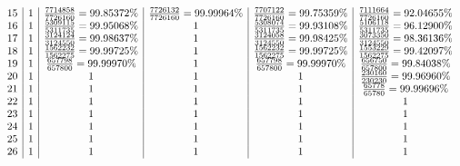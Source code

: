 \[\begin{array}{c| c| c| c| c| c}
15 & 1 & \frac{7714858}{7726160} = 99.85372\% & \frac{7726132}{7726160} = 99.99964\% & \frac{7707122}{7726160} = 99.75359\% & \frac{7111664}{7726160} = 92.04655\%\\
16 & 1 & \frac{5309115}{5311735} = 99.95068\% & 1 & \frac{5308074}{5311735} = 99.93108\% & \frac{5106118}{5311735} = 96.12900\%\\
17 & 1 & \frac{3124124}{3124550} = 99.98637\% & 1 & \frac{3124058}{3124550} = 99.98425\% & \frac{3073350}{3124550} = 98.36136\%\\
18 & 1 & \frac{1562232}{1562275} = 99.99725\% & 1 & \frac{1562232}{1562275} = 99.99725\% & \frac{1553229}{1562275} = 99.42097\%\\
19 & 1 & \frac{657798}{657800} = 99.99970\% & 1 & \frac{657798}{657800} = 99.99970\% & \frac{656750}{657800} = 99.84038\%\\
20 & 1 & 1 & 1 & 1 & \frac{230160}{230230} = 99.96960\%\\
21 & 1 & 1 & 1 & 1 & \frac{65778}{65780} = 99.99696\%\\
22 & 1 & 1 & 1 & 1 & 1\\
23 & 1 & 1 & 1 & 1 & 1\\
24 & 1 & 1 & 1 & 1 & 1\\
25 & 1 & 1 & 1 & 1 & 1\\
26 & 1 & 1 & 1 & 1 & 1\\
\end{array}
\]
